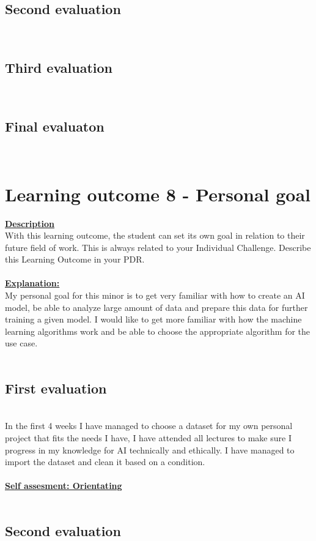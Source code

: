 \documentclass{article}
\begin{document}
\subsection{Second evaluation}\\
\subsection{Third evaluation}\\
\subsection{Final evaluaton}\\

\section{Learning outcome 8 - Personal goal}
\underline{\textbf{Description}}\\
With this learning outcome, the student can set its own goal in relation to their future field of work.
This is always related to your Individual Challenge. Describe this Learning Outcome in your PDR.\\\\
\underline{\textbf{Explanation:}}\\
My personal goal for this minor is to get very familiar with how to create an AI model, be able to analyze large amount of data
and prepare this data for further training a given model. I would like to get more familiar with how the machine learning algorithms work 
and be able to choose the appropriate algorithm for the use case.\\\\
\subsection{First evaluation}\\
In the first 4 weeks I have managed to choose a dataset for my own personal project that fits the needs I have, I have attended all lectures to make 
sure I progress in my knowledge for AI technically and ethically. I have managed to import the dataset and clean it based on a condition.\\\\ 
\underline{\textbf{Self assesment: Orientating}}\\\\
\subsection{Second evaluation}\\
\end{document}
